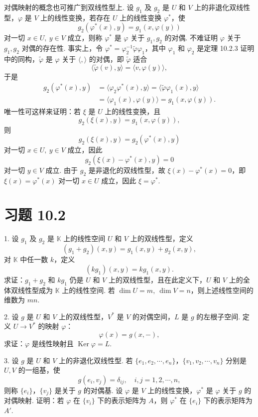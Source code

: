\documentclass[UTF8, 12pt, fontset=fandol, oneside]{ctexart}
\begin{document}
对偶映射的概念也可推广到双线性型上. 设 $g_1$ 及 $g_2$ 是 $U$ 和 $V$ 上的非退化双线性型，$\varphi$ 是 $V$ 上的线性变换，若存在 $U$ 上的线性变换 $\varphi^*$，使
\[
  g_2(\varphi^*(x),y)=g_1(x,\varphi(y))
\]
对一切 $x\in U,\ y\in V$ 成立，则称 $\varphi^*$ 是 $\varphi$ 关于 $g_1,g_2$ 的对偶. 不难证明 $\varphi$ 关于 $g_1,g_2$ 对偶的存在性. 事实上，令 $\varphi^*=\varphi_2^{-1}\widetilde\varphi\varphi_1$，其中 $\varphi_1$ 和 $\varphi_2$ 是定理 10.2.3 证明中的同构，$\widetilde\varphi$ 是 $\varphi$ 关于 $\langle,\rangle$ 的对偶，即 $\widetilde\varphi$ 适合
\[
  \langle\widetilde\varphi(v),y\rangle=\langle v,\varphi(y)\rangle,
\]
于是
\[
\begin{aligned}
  g_2(\varphi^*(x),y)&=\langle\varphi_2\varphi^*(x),y\rangle
  =\langle\widetilde\varphi\varphi_1(x),y\rangle\\
  &=\langle\varphi_1(x),\varphi(y)\rangle
  =g_1(x,\varphi(y)).
\end{aligned}
\]
唯一性可这样来证明：若 $\xi$ 是 $U$ 上的线性变换，且
\[
  g_2(\xi(x),y)=g_1(x,\varphi(y)),
\]
则
\[
  g_2(\xi(x),y)=g_2(\varphi^*(x),y)
\]
对一切 $x\in U,\ y\in V$ 成立，因此
\[
  g_2(\xi(x)-\varphi^*(x),y)=0
\]
对一切 $y\in V$ 成立. 由于 $g_2$ 是非退化的双线性型，故 $\xi(x)-\varphi^*(x)=0$，即 $\xi(x)=\varphi^*(x)$ 对一切 $x\in U$ 成立，因此 $\xi=\varphi^*$.

\section*{习题 10.2}

1. 设 $g_1$ 及 $g_2$ 是 $\mathbb K$ 上的线性空间 $U$ 和 $V$ 上的双线性型，定义
\[
  (g_1+g_2)(x,y)=g_1(x,y)+g_2(x,y),
\]
对 $\mathbb K$ 中任一数 $k$，定义
\[
  (kg_1)(x,y)=kg_1(x,y).
\]
求证：$g_1+g_2$ 和 $kg_1$ 仍是 $U$ 和 $V$ 上的双线性型，且在此定义下，$U$ 和 $V$ 上的全体双线性型成为 $\mathbb K$ 上的线性空间. 若 $\dim U=m,\ \dim V=n$，则上述线性空间的维数为 $mn$.

2. 设 $g$ 是 $U$ 和 $V$ 上的双线性型，$V^*$ 是 $V$ 的对偶空间，$L$ 是 $g$ 的左根子空间. 定义 $U\to V^*$ 的映射 $\varphi$：
\[
  \varphi(x)=g(x,-),
\]
求证：$\varphi$ 是线性映射且 $\operatorname{Ker}\varphi=L$.

3. 设 $g$ 是 $U$ 和 $V$ 上的非退化双线性型. 若 $\{e_1,e_2,\cdots,e_n\}$，$\{v_1,v_2,\cdots,v_n\}$ 分别是 $U,V$ 的一组基，使
\[
  g(e_i,v_j)=\delta_{ij},\quad i,j=1,2,\cdots,n,
\]
则称 $\{e_i\}$，$\{v_j\}$ 是关于 $g$ 的对偶基. 设 $\varphi$ 是 $V$ 上的线性变换，$\varphi^*$ 是 $\varphi$ 关于 $g$ 的对偶映射. 证明：若 $\varphi$ 在 $\{v_i\}$ 下的表示矩阵为 $A$，则 $\varphi^*$ 在 $\{e_i\}$ 下的表示矩阵为 $A'$.
\end{document}
